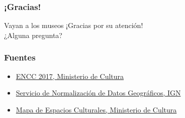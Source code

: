 \documentclass[10pt]{beamer}
\begin{document}
{
  \begin{frame}
    \frametitle{¡Gracias!}

    \vspace{15em}

    \begin{alertblock}{Vayan a los museos}
      ¡Gracias por su atención!\\
      ¿Alguna pregunta?
    \end{alertblock}
  \end{frame}
}


\begin{frame}
  \frametitle{Fuentes}
  \begin{itemize}
    \item \href{https://datos.cultura.gob.ar/dataset/encuesta-nacional-de-consumos-culturales-2017}{ENCC 2017, Ministerio de Cultura}\\
    \item \href{https://datos.gob.ar/dataset/jgm-servicio-normalizacion-datos-geograficos/archivo/jgm_8.26}{Servicio de Normalización de Datos Geográficos, IGN}
    \item \href{https://datos.gob.ar/dataset/cultura-mapa-cultural-espacios-culturales}{Mapa de Espacios Culturales, Ministerio de Cultura}
  \end{itemize}
  
\end{frame}
\end{document}
